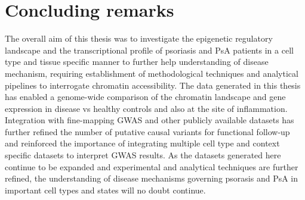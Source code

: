 \section{Concluding remarks}
The overall aim of this thesis was to investigate the epigenetic regulatory landscape and the transcriptional profile of psoriasis and PsA patients in a cell type and tissue specific manner to further help understanding of disease mechanism, requiring establishment of methodological techniques and analytical pipelines to interrogate chromatin accessibility. The data generated in this thesis has enabled a genome-wide comparison of the chromatin landscape and gene expression in disease vs healthy controls and also at the site of inflammation. Integration with fine-mapping GWAS and other publicly available datasets has further refined the number of putative causal variants for functional follow-up and reinforced the importance of integrating multiple cell type and context specific datasets to interpret GWAS results. As the datasets generated here continue to be expanded and experimental and analytical techniques are further refined, the understanding of disease mechanisms governing psorasis and PsA in important cell types and states will no doubt continue.












